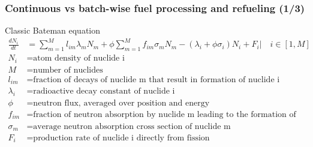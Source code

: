 \begin{frame}
\frametitle{Continuous vs batch-wise fuel processing  and refueling (1/3)}
\vspace{-8mm}
\begin{block}{Classic Bateman equation}
	\begin{align}
	\frac{dN_i}{dt} &= \sum_{m=1}^{M}l_{im}\lambda_mN_m + 
	\phi\sum_{m=1}^{M}f_{im}\sigma_mN_m - (\lambda_i + \phi\sigma_i)N_i + 
	F_i\Big|\quad{i\in [1,M]} \nonumber\\
	N_i &= \mbox{atom density of nuclide i} \nonumber \\
	M &= \mbox{number of nuclides} \nonumber \\
	l_{im} &= \mbox{fraction of decays of nuclide m that result in formation 
	of 
		nuclide i}\nonumber \\
	\lambda_i &= \mbox{radioactive decay constant of nuclide i} \nonumber \\
	\phi &= \mbox{neutron flux, averaged over position and energy} \nonumber \\
	f_{im} &= \mbox{fraction of neutron absorption by nuclide m leading to the 
		formation of nuclide i} \nonumber \\
	\sigma_m &= \mbox{average neutron absorption cross section of nuclide m} 
	\nonumber \\
	F_i &= \mbox{production rate of nuclide i directly from fission}\nonumber
	\end{align}
\end{block}
\end{frame}

